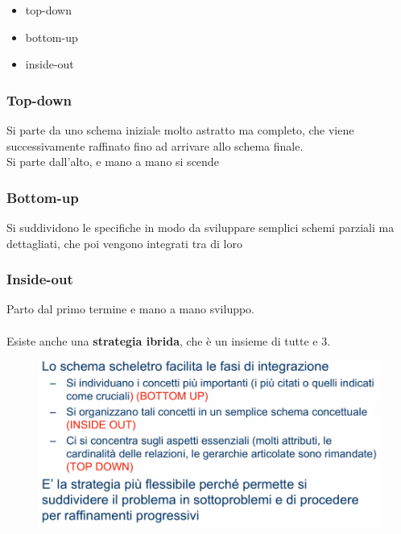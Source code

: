 \documentclass[12pt, a4paper]{article}
\begin{document}
    \begin{itemize}
        \item top-down
        \item bottom-up
        \item inside-out
    \end{itemize}

    \subsubsection*{Top-down}
    Si parte da uno schema iniziale molto astratto ma completo, che viene successivamente
    raffinato fino ad arrivare allo schema finale.\\Si parte dall'alto, e mano a mano si scende

    \subsubsection*{Bottom-up}
    Si suddividono le specifiche in modo da sviluppare semplici schemi parziali ma dettagliati,
    che poi vengono integrati tra di loro

    \subsubsection*{Inside-out}
    Parto dal primo termine e mano a mano sviluppo.
    \\\\
    Esiste anche una \textbf{strategia ibrida}, che è un insieme di tutte e 3.
    \begin{figure}[htbp]
        \centering
        \includegraphics[scale=0.5]{ibrido.png}
        
    \end{figure}    

    \newpage
\end{document}
